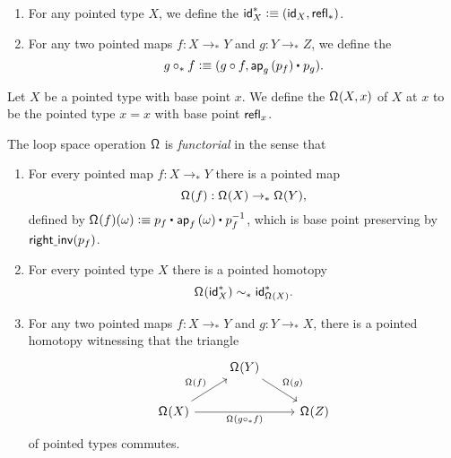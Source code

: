 \begin{defn}
\begin{enumerate}
\item For any pointed type $X$, we define the  $\idp_X\defeq (\idfunc[X],\refl{\ast})$. 
\item For any two pointed maps $f:X\to_\ast Y$ and $g:Y\to_\ast Z$, we define the 
\begin{equation*}
g\mathbin{\circ_\ast} f \defeq (g\circ f,\ct{\ap{g}{p_f}}{p_g}).
\end{equation*}
\end{enumerate}
\end{defn}

\begin{defn}
Let $X$ be a pointed type with base point $x$. We define the  $\loopspace{X,x}$ of $X$ at $x$ to be the pointed type $x=x$ with base point $\refl{x}$. 
\end{defn}

\begin{defn}
The loop space operation $\loopspacesym$ is \emph{functorial} in the sense that
\begin{enumerate}
\item For every pointed map $f:X\to_\ast Y$ there is a pointed map
\begin{equation*}
\loopspace{f}:\loopspace{X}\to_\ast \loopspace{Y},
\end{equation*}
defined by $\loopspace{f}(\omega)\defeq \ct{p_f}{\ap{f}{\omega}}{p_f^{-1}}$, which is base point preserving by $\rightinv(p_f)$. 
\item For every pointed type $X$ there is a pointed homotopy
\begin{equation*}
\loopspace{\idp_X}\htpy_\ast \idp_{\loopspace{X}}.
\end{equation*}
\item For any two pointed maps $f:X\to_\ast Y$ and $g:Y\to_\ast X$, there is a pointed homotopy witnessing that the triangle
\begin{equation*}
\begin{tikzcd}
& \loopspace{Y} \arrow[dr,"\loopspace{g}"] \\
\loopspace{X} \arrow[rr,swap,"\loopspace{g\circ_\ast f}"] \arrow[ur,"\loopspace{f}"] & & \loopspace{Z}
\end{tikzcd}
\end{equation*}
of pointed types commutes.
\end{enumerate}
\end{defn}

